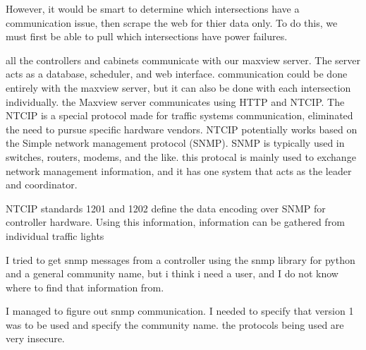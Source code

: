 However, it would be smart to determine which intersections have a communication issue, then scrape the web for thier data only. To do this, we must first be able to pull which intersections have power failures.

all the controllers and cabinets communicate with our maxview server. The server acts as a database, scheduler, and web interface. communication could be done entirely with the maxview server, but it can also be done with each intersection individually. the Maxview server communicates using HTTP and NTCIP. The NTCIP is a special protocol made for traffic systems communication, eliminated the need to pursue specific hardware vendors. NTCIP potentially works based on the Simple network management protocol (SNMP). SNMP is typically used in switches, routers, modems, and the like. this protocal is mainly used to exchange network management information, and it has one system that acts as the leader and coordinator.

NTCIP standards 1201 and 1202 define the data encoding over SNMP for controller hardware. Using this information, information can be gathered from individual traffic lights

I tried to get snmp messages from a controller using the snmp library for python and a general community name, but i think i need a user, and I do not know where to find that information from.

I managed to figure out snmp communication. I needed to specify that version 1 was to be used and specify the community name. the protocols being used are very insecure.